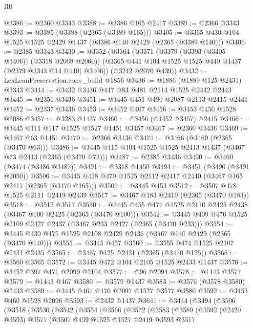 \begin{lexlean}{R0}
\begin{coremodule}
@3386 := @2360 @3343
@3388 := @3386 @165 @2417
@3389 := @2366 @3343
@3393 := @3385 (@3388 (@2365 (@3389 @165)))
@3405 := @3365 @430 @104 @1525 @1525 @2429 @1437 (@3386 @140 @2429 (@2365 (@3389 @140)))
@3406 := @2385 @3343
@3430 := @3352
    (@3364
      (@3371
        (@3379 (@3393 (@3405 @3406)) (@3318 @2068 @2060))
        (@3365 @441 @104 @1525 @1525 @440 @1437 (@2379 @3343 @14 @440) @3406))
      (@3242 @2070 @439))
@3432 := LexLeanPreservation.conv_build @1856
@3436 := @1886 (@1889 @125 @2431) @3343
@3444 := @3432 @3436 @447 @83 @481 @2114 @1525 @2442 @2443
@3445 := @2351 @3436
@3451 := @3445 @451 @480 @2087 @2113 @2415 @2441
@3452 := @2337 @3436
@3453 := @3452 @407
@3456 := @3453 @450 @1528 @2086
@3457 := @3283 @1437
@3460 := @3456 (@1452 @3457) @2415
@3466 := @3445 @111 @117 @1525 @1527 @1451 @3457
@3467 := @2360 @3436
@3469 := @3467 @63 @1451
@3470 := @2366 @3436
@3474 := @3466 (@3469 (@2365 (@3470 @63)))
@3486 := @3445 @115 @104 @1525 @1525 @2413 @1437 (@3467 @73 @2413 (@2365 (@3470 @73)))
@3487 := @2385 @3436
@3490 := @3460 (@3474 (@3486 @3487))
@3491 := @3318 @1450
@3494 := @3451 (@3490 (@3491 @2050))
@3506 := @3445 @428 @479 @1525 @2112 @2417 @2440 (@3467 @165 @2417 (@2365 (@3470 @165)))
@3507 := @3445 @453
@3512 := @3507 @478 @1525 @2111 @2419 @2439
@3517 := @3467 @183 @2419 (@2365 (@3470 @183))
@3518 := @3512 @3517
@3530 := @3445 @455 @477 @1525 @2110 @2425 @2438 (@3467 @100 @2425 (@2365 (@3470 @100)))
@3542 := @3445 @409 @476 @1525 @2109 @2427 @2437 (@3467 @233 @2427 (@2365 (@3470 @233)))
@3554 := @3445 @430 @475 @1525 @2108 @2429 @2436 (@3467 @140 @2429 (@2365 (@3470 @140)))
@3555 := @3445 @457
@3560 := @3555 @474 @1525 @2107 @2431 @2435
@3565 := @3467 @125 @2431 (@2365 (@3470 @125))
@3566 := @3560 @3565
@3572 := @3445 @472 @104 @2105 @1525 @2433 @1437
@3576 := @3452 @397 @471 @2099 @2104
@3577 := @96 @2094
@3578 := @1443 @3577
@3579 := @1443 @467
@3580 := @3579 @1437
@3583 := @3576 (@3578 @3580) @2433
@3589 := @3445 @461 @470 @2097 @1527 @3577 @3580
@3592 := @3453 @460 @1528 @2096
@3593 := @2432 @1437
@3641 := @3444
    (@3494
      (@3506
        (@3518
          (@3530
            (@3542
              (@3554
                (@3566
                  (@3572
                    (@3583
                      (@3589
                        (@3592
                          (@2420 @3593)
                          @3577
                          (@3507
                            @459
                            @1525
                            @1527
                            @2419
                            @3593
                            @3517

\end{coremodule}
\end{lexlean}
